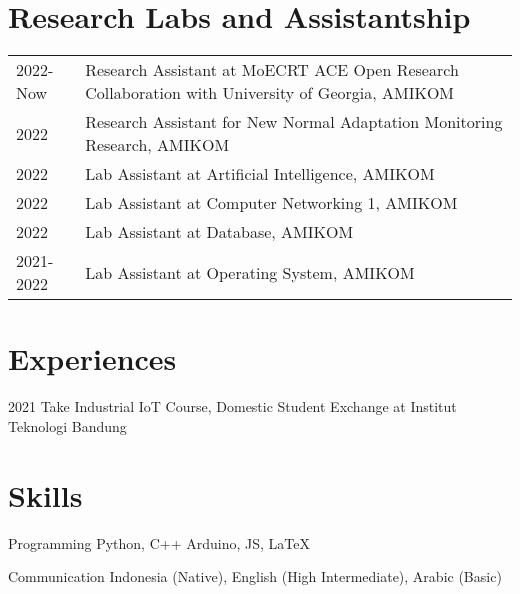 \documentclass[12pt,letterpaper]{report}
\begin{document}
    \section*{Research Labs and Assistantship}
    \begin{tabular}{@{}p{}p{}}
        2022-Now & Research Assistant at MoECRT ACE Open Research Collaboration with University of Georgia, AMIKOM \\
        2022 & Research Assistant for New Normal Adaptation Monitoring Research, AMIKOM \\
        2022 & Lab Assistant at Artificial Intelligence, AMIKOM \\
        2022 & Lab Assistant at Computer Networking 1, AMIKOM \\
        2022 & Lab Assistant at Database, AMIKOM \\
        2021-2022 & Lab Assistant at Operating System, AMIKOM \\
    \end{tabular}



    \section*{Experiences}
    \begin{tablist}
        \item[2021] \tab{}Take Industrial IoT Course, Domestic Student Exchange at Institut Teknologi Bandung
    \end{tablist}

    \section*{Skills}
    \begin{tablist}
        \item[Programming] \tab{}Python, C++ Arduino, JS, \LaTeX \\
        \item[Communication] \tab{}Indonesia (Native), English (High Intermediate), Arabic (Basic) \\
    \end{tablist}
\end{document}
